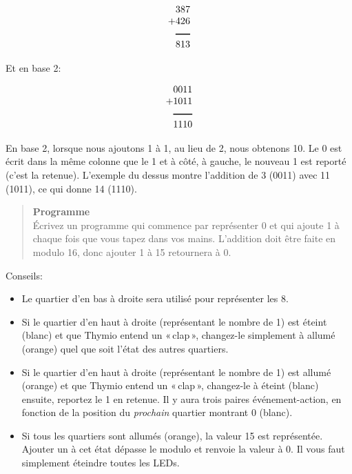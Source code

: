 \begin{displaymath}
\begin{array}{r}
387\\
+426\\
\rule[1pt]{1.5em}{1pt}\\
813\\
\end{array}
\end{displaymath}

Et en base 2:

\begin{displaymath}
\begin{array}{r}
0011\\
+1011\\
\rule[1pt]{2em}{1pt}\\
1110\\
\end{array}
\end{displaymath}

En base 2, lorsque nous ajoutons 1 à 1, au lieu de 2, nous obtenons 10. Le 0 est écrit dans la même colonne que le 1 et à côté, à gauche, le nouveau 1 est reporté (c'est la retenue). L'exemple du dessus montre l'addition de 3 (0011) avec 11 (1011), ce qui donne 14 (1110).

\begin{quote}
\textbf{Programme}\\
Écrivez un programme qui commence par représenter 0 et qui ajoute 1 à chaque fois que vous tapez dans vos mains. L'addition doit être faite en modulo 16, donc ajouter 1 à 15 retournera à 0.
\end{quote}

Conseils:

\begin{itemize}
\item Le quartier d'en bas à droite sera utilisé pour représenter les 8.
\item Si le quartier d'en haut à droite (représentant le nombre de 1) est éteint (blanc) et que Thymio entend un «\,clap\,», changez-le simplement à allumé (orange) quel que soit l'état des autres quartiers.
\item Si le quartier d'en haut à droite (représentant le nombre de 1) est allumé (orange) et que Thymio entend un «\,clap\,», changez-le à éteint (blanc) ensuite, reportez le 1 en retenue.
Il y aura trois paires événement-action, en fonction de la position du \emph{prochain} quartier montrant 0 (blanc).
\item Si tous les quartiers sont allumés (orange), la valeur 15 est représentée. Ajouter un à cet état dépasse le modulo et renvoie la valeur à 0. Il vous faut simplement éteindre toutes les LEDs.
\end{itemize}


